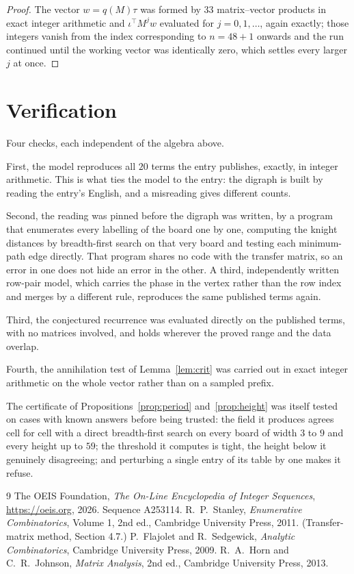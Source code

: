 \documentclass[11pt,a4paper]{article}
\theoremstyle{plain}
\theoremstyle{definition}
\begin{document}
\begin{proof}
The vector $w=q(M)\tau$ was formed by $33$ matrix--vector products in exact integer
arithmetic and $\iota^{\!\top}M^{j}w$ evaluated for $j=0,1,\dots$, again exactly; those
integers vanish from the index corresponding to $n=48+1$ onwards and the run continued
until the working vector was identically zero, which settles every larger $j$ at once.
\end{proof}

\section{Verification}

Four checks, each independent of the algebra above.

First, the model reproduces all $20$ terms the entry publishes, exactly, in integer
arithmetic. This is what ties the model to the entry: the digraph is built by reading the
entry's English, and a misreading gives different counts.

Second, the reading was pinned before the digraph was written, by a program that enumerates
every labelling of the board one by one, computing the knight distances by breadth-first
search on that very board and testing each minimum-path edge directly. That program shares no
code with the transfer matrix, so an error in one does not hide an error in the other. A
third, independently written row-pair model, which carries the phase in the vertex rather than
the row index and merges by a different rule, reproduces the same published terms again.

Third, the conjectured recurrence was evaluated directly on the published terms, with no
matrices involved, and holds wherever the proved range and the data overlap.

Fourth, the annihilation test of Lemma~\ref{lem:crit} was carried out in exact integer
arithmetic on the whole vector rather than on a sampled prefix.

The certificate of Propositions~\ref{prop:period} and~\ref{prop:height} was itself tested
on cases with known answers before being trusted: the field it produces agrees cell for cell
with a direct breadth-first search on every board of width $3$ to $9$ and every height up to
$59$; the threshold it computes is tight, the height below it genuinely disagreeing; and
perturbing a single entry of its table by one makes it refuse.

\begin{thebibliography}{9}
 The OEIS Foundation, \emph{The On-Line Encyclopedia of Integer
Sequences}, \url{https://oeis.org}, 2026. Sequence A253114.
 R.~P.~Stanley, \emph{Enumerative Combinatorics}, Volume 1, 2nd ed.,
Cambridge University Press, 2011. (Transfer-matrix method, Section 4.7.)
 P.~Flajolet and R.~Sedgewick, \emph{Analytic Combinatorics}, Cambridge
University Press, 2009.
 R.~A.~Horn and C.~R.~Johnson, \emph{Matrix Analysis}, 2nd ed., Cambridge
University Press, 2013.
\end{thebibliography}
\end{document}
